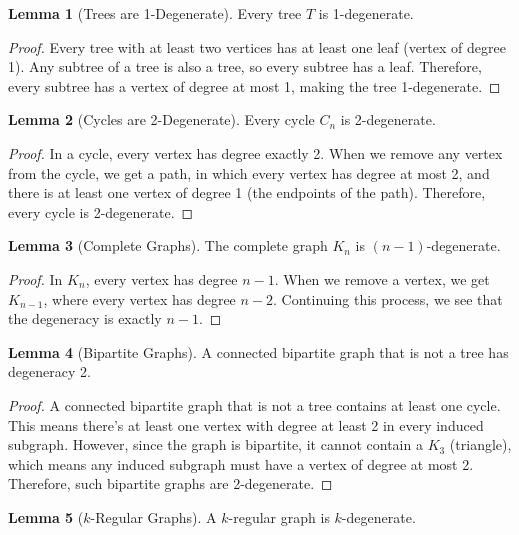 \documentclass{article}
\theoremstyle{definition}
\newtheorem{lemma}{Lemma}
\begin{document}
\begin{lemma}[Trees are 1-Degenerate]
Every tree $T$ is 1-degenerate.
\end{lemma}

\begin{proof}
Every tree with at least two vertices has at least one leaf (vertex of degree 1). Any subtree of a tree is also a tree, so every subtree has a leaf. Therefore, every subtree has a vertex of degree at most 1, making the tree 1-degenerate.
\end{proof}

\begin{lemma}[Cycles are 2-Degenerate]
Every cycle $C_n$ is 2-degenerate.
\end{lemma}

\begin{proof}
In a cycle, every vertex has degree exactly 2. When we remove any vertex from the cycle, we get a path, in which every vertex has degree at most 2, and there is at least one vertex of degree 1 (the endpoints of the path). Therefore, every cycle is 2-degenerate.
\end{proof}

\begin{lemma}[Complete Graphs]
The complete graph $K_n$ is $(n-1)$-degenerate.
\end{lemma}

\begin{proof}
In $K_n$, every vertex has degree $n-1$. When we remove a vertex, we get $K_{n-1}$, where every vertex has degree $n-2$. Continuing this process, we see that the degeneracy is exactly $n-1$.
\end{proof}

\begin{lemma}[Bipartite Graphs]
A connected bipartite graph that is not a tree has degeneracy 2.
\end{lemma}

\begin{proof}
A connected bipartite graph that is not a tree contains at least one cycle. This means there's at least one vertex with degree at least 2 in every induced subgraph. However, since the graph is bipartite, it cannot contain a $K_3$ (triangle), which means any induced subgraph must have a vertex of degree at most 2. Therefore, such bipartite graphs are 2-degenerate.
\end{proof}

\begin{lemma}[$k$-Regular Graphs]
A $k$-regular graph is $k$-degenerate.
\end{lemma}
\end{document}
